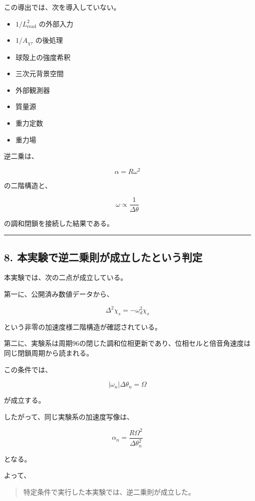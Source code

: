 \documentclass[
  10pt,
  a4paper,
]{ltjsarticle}
\providecommand{\tightlist}{%
  \setlength{\itemsep}{0pt}\setlength{\parskip}{0pt}}
\begin{document}
この導出では、次を導入していない。

\begin{itemize}
\tightlist
\item
  \(1/L_{\mathrm{read}}^2\) の外部入力
\item
  \(1/A_{\chi\tau}\) の後処理
\item
  球殻上の強度希釈
\item
  三次元背景空間
\item
  外部観測器
\item
  質量源
\item
  重力定数
\item
  重力場
\end{itemize}

逆二乗は、

\[
\alpha=R\omega^2
\]

の二階構造と、

\[
\omega\propto\frac{1}{\Delta\theta}
\]

の調和閉鎖を接続した結果である。

\begin{center}\rule{0.5\linewidth}{0.5pt}\end{center}

\subsection{8.
本実験で逆二乗則が成立したという判定}\label{ux672cux5b9fux9a13ux3067ux9006ux4e8cux4e57ux5247ux304cux6210ux7acbux3057ux305fux3068ux3044ux3046ux5224ux5b9a}

本実験では、次の二点が成立している。

第一に、公開済み数値データから、

\[
\Delta^2\chi_s
=-\omega_d^2\chi_s
\]

という非零の加速度様二階構造が確認されている。

第二に、実験系は周期96の閉じた調和位相更新であり、位相セルと倍音角速度は同じ閉鎖周期から読まれる。

この条件では、

\[
|\omega_n|\Delta\theta_n=\Omega
\]

が成立する。

したがって、同じ実験系の加速度写像は、

\[
\alpha_n
=\frac{R\Omega^2}{\Delta\theta_n^2}
\]

となる。

よって、

\begin{quote}
特定条件で実行した本実験では、逆二乗則が成立した。
\end{quote}
\end{document}
